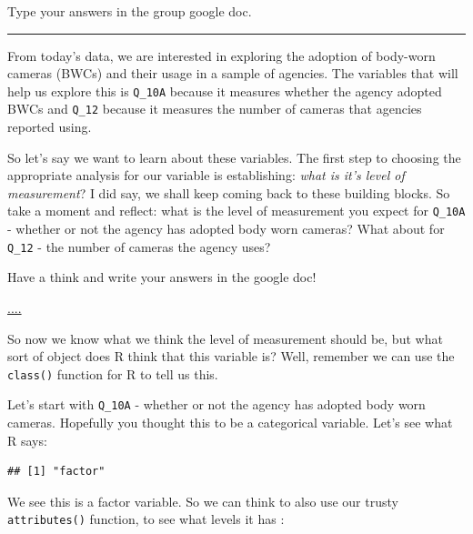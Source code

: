 \documentclass[
]{book}
\newenvironment{Shaded}{\begin{snugshade}}{\end{snugshade}}
\newcommand{\FunctionTok}[1]{\textcolor[rgb]{0.00,0.00,0.00}{#1}}
\newcommand{\NormalTok}[1]{#1}
\newcommand{\SpecialCharTok}[1]{\textcolor[rgb]{0.00,0.00,0.00}{#1}}
\begin{document}
Type your answers in the group google doc.

\begin{center}\rule{0.5\linewidth}{0.5pt}\end{center}

From today's data, we are interested in exploring the adoption of body-worn cameras (BWCs) and their usage in a sample of agencies. The variables that will help us explore this is \texttt{Q\_10A} because it measures whether the agency adopted BWCs and \texttt{Q\_12} because it measures the number of cameras that agencies reported using.

So let's say we want to learn about these variables. The first step to choosing the appropriate analysis for our variable is establishing: \emph{what is it's level of measurement}? I did say, we shall keep coming back to these building blocks. So take a moment and reflect: what is the level of measurement you expect for \texttt{Q\_10A} - whether or not the agency has adopted body worn cameras? What about for \texttt{Q\_12} - the number of cameras the agency uses?

Have a think and write your answers in the google doc!

\url{....}

So now we know what we think the level of measurement should be, but what sort of object does R think that this variable is? Well, remember we can use the \texttt{class()} function for R to tell us this.

Let's start with \texttt{Q\_10A} - whether or not the agency has adopted body worn cameras. Hopefully you thought this to be a categorical variable. Let's see what R says:

\begin{Shaded}
\end{Shaded}

\begin{verbatim}
## [1] "factor"
\end{verbatim}

We see this is a factor variable. So we can think to also use our trusty \texttt{attributes()} function, to see what levels it has :

\begin{Shaded}
\end{Shaded}
\end{document}
